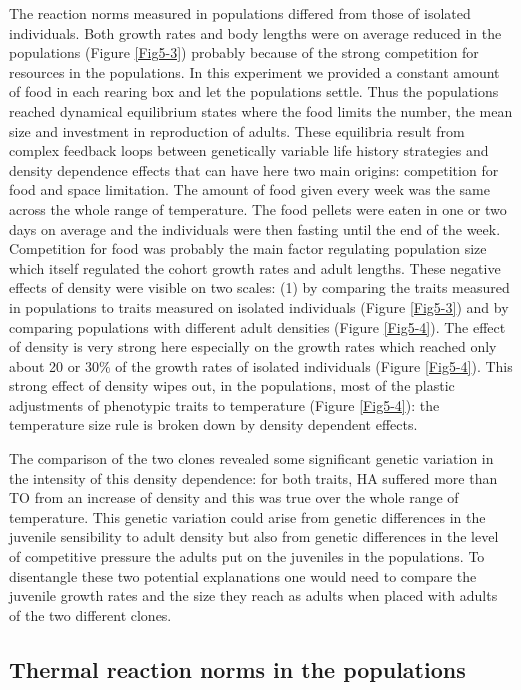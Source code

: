 The reaction norms measured in populations differed from those of isolated
individuals. Both growth rates and body lengths were on average reduced in the
populations (Figure \ref{Fig5-3}) probably because of the strong competition for
resources in the populations. In this experiment we provided a constant amount
of food in each rearing box and let the populations settle. Thus the populations
reached dynamical equilibrium states where the food limits the number, the mean
size and investment in reproduction of adults. These equilibria result from
complex feedback loops between genetically variable life history strategies
\autocites{tully2008a} and density dependence effects \autocites{kokko2007a} that
can have here two main origins: competition for food and space limitation. The
amount of food given every week was the same across the whole range of
temperature. The food pellets were eaten in one or two days on average and the
individuals were then fasting until the end of the week. Competition for food
was probably the main factor regulating population size which itself regulated
the cohort growth rates and adult lengths. These negative effects of density
were visible on two scales: (1) by comparing the traits measured in populations
to traits measured on isolated individuals (Figure \ref{Fig5-3}) and by
comparing populations with different adult densities (Figure \ref{Fig5-4}).
The effect of density is very strong here especially on the growth rates which reached only about 20 or 30\% of the
growth rates of isolated individuals (Figure \ref{Fig5-4}). This strong effect
of density wipes out, in the populations, most of the plastic adjustments of phenotypic
traits to temperature (Figure \ref{Fig5-4}): the temperature size rule is broken
down by density dependent effects.

The comparison of the two clones revealed some significant genetic variation in
the intensity of this density dependence: for both traits, HA suffered more than
TO from an increase of density and this was true over the whole range of
temperature. This genetic variation could arise from genetic differences in the
juvenile sensibility to adult density but also from genetic differences in the
level of competitive pressure the adults put on the juveniles in the
populations. To disentangle these two potential explanations one would need to
compare the juvenile growth rates and the size they reach as adults when placed
with adults of the two different clones.

\subsection{Thermal reaction norms in the populations}

